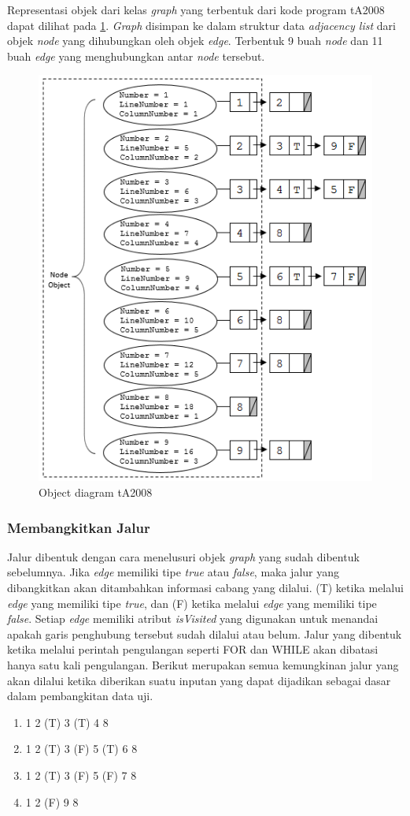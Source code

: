 Representasi objek dari kelas \textit{graph} yang terbentuk dari kode program tA2008 dapat dilihat pada \ref{fig:objectdiagram}. \textit{Graph} disimpan ke dalam struktur data \textit{adjacency list} dari objek \textit{node} yang dihubungkan oleh objek \textit{edge}.  Terbentuk 9 buah \textit{node} dan 11 buah \textit{edge} yang menghubungkan antar \textit{node} tersebut.
\begin{figure}
	\centering
	\includegraphics[width=0.85\linewidth]{gambar/ObjectDiagram}
	\caption{Object diagram tA2008}
	\label{fig:objectdiagram}
\end{figure}

\subsubsection*{Membangkitkan Jalur}
Jalur dibentuk dengan cara menelusuri objek \textit{graph} yang sudah dibentuk sebelumnya. Jika \textit{edge} memiliki tipe \textit{true} atau \textit{false}, maka jalur yang dibangkitkan akan ditambahkan informasi cabang yang dilalui. (T) ketika melalui \textit{edge} yang memiliki tipe \textit{true}, dan (F)  ketika melalui \textit{edge} yang memiliki tipe \textit{false}. Setiap \textit{edge} memiliki atribut \textit{isVisited} yang digunakan untuk menandai apakah garis penghubung tersebut sudah dilalui atau belum. Jalur yang dibentuk ketika melalui perintah pengulangan seperti FOR dan WHILE akan dibatasi hanya satu kali pengulangan. Berikut merupakan semua kemungkinan jalur yang akan dilalui ketika diberikan suatu inputan yang dapat dijadikan sebagai dasar dalam pembangkitan data uji.
\begin{enumerate}[noitemsep] 
	\item 1 2 (T) 3 (T) 4 8
	\item 1 2 (T) 3 (F) 5 (T) 6 8
	\item 1 2 (T) 3 (F) 5 (F) 7 8
	\item 1 2 (F) 9 8
\end{enumerate}

